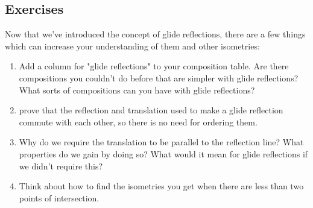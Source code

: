 \documentclass[11pt]{article}
\theoremstyle{definition}
\begin{document}
\subsection{Exercises}

Now that we've introduced the concept of glide reflections, there are a few
things which can increase your understanding of them and other isometries:
\begin{enumerate}
\item Add a column for "glide reflections" to your composition table. Are there
  compositions you couldn't do before that are simpler with glide reflections?
  What sorts of compositions can you have with glide reflections?
\item prove that the reflection and translation used to make a glide reflection
  commute with each other, so there is no need for ordering them.
\item Why do we require the translation to be parallel to the reflection line?
  What properties do we gain by doing so? What would it mean for glide
  reflections if we didn't require this?
\item Think about how to find the isometries you get when there are less than
  two points of intersection.
\end{enumerate}
\end{document}
